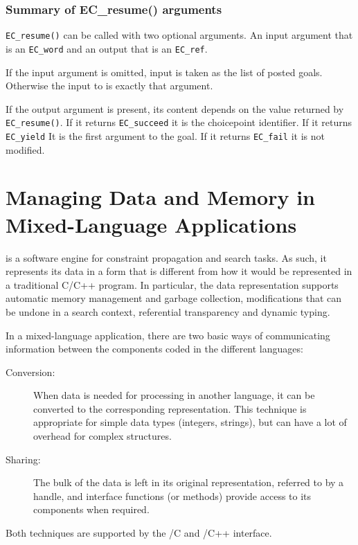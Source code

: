 \subsection{Summary of EC_resume() arguments}

\verb.EC_resume(). can be called with two optional arguments. An
input argument that is an \verb.EC_word. and an output that is an
\verb.EC_ref..

If the input argument is omitted, input is taken as the list of posted
goals. Otherwise the input to {\eclipse} is exactly that argument.

If the output argument is present, its content depends on the value
returned by \verb.EC_resume().. If it returns \verb.EC_succeed. it is
the choicepoint identifier. If it returns \verb.EC_yield. It is the
first argument to the   goal. If it returns \verb.EC_fail.
it is not modified.


\chapter{Managing Data and Memory in Mixed-Language Applications}
\label{chapmixed}

{\eclipse} is a software engine for constraint propagation and search tasks.
As such, it represents its data in a form that is different
from how it would be represented in a traditional C/C++ program.
In particular,
the {\eclipse} data representation supports automatic memory management
and garbage collection, modifications that can be undone in a search context,
referential transparency and dynamic typing.

In a mixed-language application, there are two basic ways of communicating
information between the components coded in the different languages:
\begin{description}
\item[Conversion:] When data is needed for processing in another language,
        it can be converted to the corresponding representation.
        This technique is appropriate for simple data types (integers, strings),
        but can have a lot of overhead for complex structures.
\item[Sharing:] The bulk of the data is left in its original representation,
        referred to by a handle, and interface functions (or methods) provide
        access to its components when required.
\end{description}
Both techniques are supported by the {\eclipse}/C and {\eclipse}/C++ interface.


